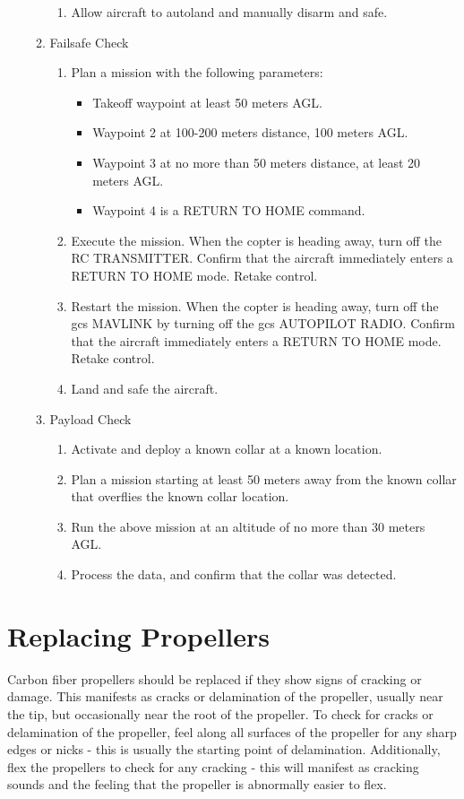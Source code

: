 \documentclass{report}
\begin{document}
\begin{enumerate}
\begin{enumerate}
\begin{enumerate}
							\item Allow aircraft to autoland and manually disarm and safe.
						\end{enumerate}
					\item Failsafe Check
						\begin{enumerate}
							\item Plan a mission with the following parameters:
								\begin{itemize}
									\item Takeoff waypoint at least 50 meters AGL.
									\item Waypoint 2 at 100-200 meters distance, 100 meters AGL.
									\item Waypoint 3 at no more than 50 meters distance, at least 20 meters AGL.
									\item Waypoint 4 is a RETURN TO HOME command.
								\end{itemize}
							\item Execute the mission.  When the copter is heading away, turn off the RC TRANSMITTER.  Confirm that the aircraft immediately enters a RETURN TO HOME mode.  Retake control.
							\item Restart the mission.  When the copter is heading away, turn off the \gls{gcs} MAVLINK by turning off the \gls{gcs} AUTOPILOT RADIO.  Confirm that the aircraft immediately enters a RETURN TO HOME mode.  Retake control.
							\item Land and safe the aircraft.
						\end{enumerate}
					\item Payload Check
						\begin{enumerate}
							\item Activate and deploy a known collar at a known location.
							\item Plan a mission starting at least 50 meters away from the known collar that overflies the known collar location.
							\item Run the above mission at an altitude of no more than 30 meters AGL.
							\item Process the data, and confirm that the collar was detected.
						\end{enumerate}
				\end{enumerate}
		\end{enumerate}
	\section{Replacing Propellers}
		Carbon fiber propellers should be replaced if they show signs of cracking or damage.  This manifests as cracks or delamination of the propeller, usually near the tip, but occasionally near the root of the propeller.  To check for cracks or delamination of the propeller, feel along all surfaces of the propeller for any sharp edges or nicks - this is usually the starting point of delamination.  Additionally, flex the propellers to check for any cracking - this will manifest as cracking sounds and the feeling that the propeller is abnormally easier to flex.
\end{document}
